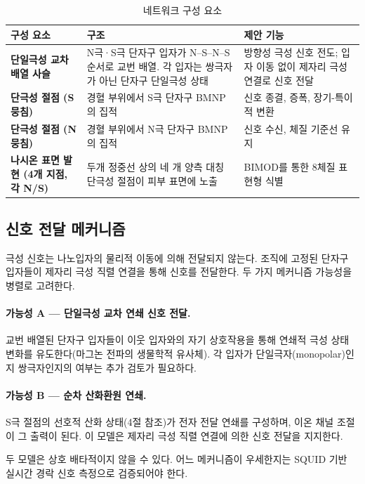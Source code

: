 \documentclass[12pt,a4paper]{article}
\begin{document}
\begin{table}[h]
\centering
\caption{네트워크 구성 요소}
\begin{tabular}{>{\bfseries}p{3cm} p{5.5cm} p{5.5cm}}
\toprule
구성 요소 & 구조 & 제안 기능 \\
\midrule
단일극성 교차배열 사슬 &
  N극·S극 단자구 입자가 N--S--N--S 순서로 교번 배열.
  각 입자는 쌍극자가 아닌 단자구 단일극성 상태 &
  방향성 극성 신호 전도;
  입자 이동 없이 제자리 극성 연결로 신호 전달 \\[4pt]
단극성 절점 (S 뭉침) &
  경혈 부위에서 S극 단자구 BMNP의 집적 &
  신호 종결, 증폭, 장기-특이적 변환 \\[4pt]
단극성 절점 (N 뭉침) &
  경혈 부위에서 N극 단자구 BMNP의 집적 &
  신호 수신, 체질 기준선 유지 \\[4pt]
나시온 표면 발현 (4개 지점, 각 N/S) &
  두개 정중선 상의 네 개 양측 대칭 단극성 절점이
  피부 표면에 노출 &
  BIMOD를 통한 8체질 표현형 식별 \\
\bottomrule
\end{tabular}
\end{table}

\subsection{신호 전달 메커니즘}
극성 신호는 나노입자의 물리적 이동에 의해 전달되지 않는다.
조직에 고정된 단자구 입자들이 제자리 극성 직렬 연결을 통해 신호를 전달한다.
두 가지 메커니즘 가능성을 병렬로 고려한다.

\paragraph{가능성 A --- 단일극성 교차 연쇄 신호 전달.}
교번 배열된 단자구 입자들이 이웃 입자와의 자기 상호작용을 통해
연쇄적 극성 상태 변화를 유도한다(마그논 전파의 생물학적 유사체).
각 입자가 단일극자(monopolar)인지 쌍극자인지의 여부는 추가 검토가 필요하다.

\paragraph{가능성 B --- 순차 산화환원 연쇄.}
S극 절점의 선호적 산화 상태(4절 참조)가 전자 전달 연쇄를 구성하며,
이온 채널 조절이 그 출력이 된다.
이 모델은 제자리 극성 직렬 연결에 의한 신호 전달을 지지한다.

두 모델은 상호 배타적이지 않을 수 있다.
어느 메커니즘이 우세한지는 SQUID 기반 실시간 경락 신호 측정으로 검증되어야 한다.
\end{document}
